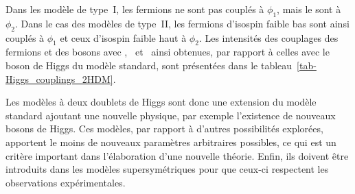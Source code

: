 \par
Dans les modèle de type~I, les fermions ne sont pas couplés à $\phi_1$, mais le sont à $\phi_2$.
Dans le cas des modèles de type~II, les fermions d'isospin faible bas sont ainsi couplés à $\phi_1$ et ceux d'isospin faible haut à $\phi_2$.
Les intensités des couplages des fermions et des bosons avec \higgs, \Higgs\ et \HiggsA\ ainsi obtenues, par rapport à celles avec le boson de Higgs du modèle standard, sont présentées dans le tableau~\ref{tab-Higgs_couplings_2HDM}.
\par Les modèles à deux doublets de Higgs sont donc une extension du modèle standard ajoutant une nouvelle physique, par exemple l'existence de nouveaux bosons de Higgs.
Ces modèles, par rapport à d'autres possibilités explorées, apportent le moins de nouveaux paramètres arbitraires possibles, ce qui est un critère important dans l'élaboration d'une nouvelle théorie.
Enfin, ils doivent être introduits dans les modèles supersymétriques pour que ceux-ci respectent les observations expérimentales.

